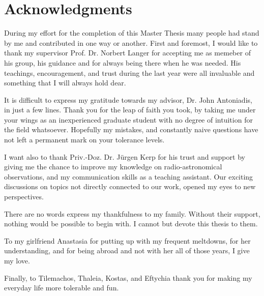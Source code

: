 \documentclass[../main/thesis_msc.tex]{subfiles}
\begin{document}
\chapter*{Acknowledgments}

During my effort for the completion of this Master Thesis many people had stand by me and contributed in one way or another. First and foremost, I would like to thank my supervisor Prof. Dr. Norbert Langer for accepting me as memeber of his group, his guidance and for always being there when he was needed. His teachings, encouragement, and trust during the last year were all invaluable and something that I will always hold dear.


It is difficult to express my gratitude towards my advisor, Dr. John Antoniadis, in just a few lines. Thank you for the leap of faith you took, by taking me under your wings as an inexperienced graduate student with no degree of intuition for the field whatsoever. Hopefully my mistakes, and constantly naive questions have not left a permanent mark on your tolerance levels.


I want also to thank Priv.-Doz. Dr. J\"urgen Kerp for his trust and support by giving me the chance to improve my knowledge on radio-astronomical observations, and my communication skills as a teaching assistant. Our exciting discussions on topics not directly connected to our work, opened my eyes to new perspectives. 


There are no words express my thankfulness to my family. Without their support, nothing would be possible to begin with. I cannot but devote this thesis to them.


To my girlfriend Anastasia for putting up with my frequent meltdowns, for her understanding, and for being abroad and not with her all of those years, I give my love.


Finally, to Tilemachos, Thaleia, Kostas, and Eftychia thank you for making my everyday life more tolerable and fun.
\end{document}
